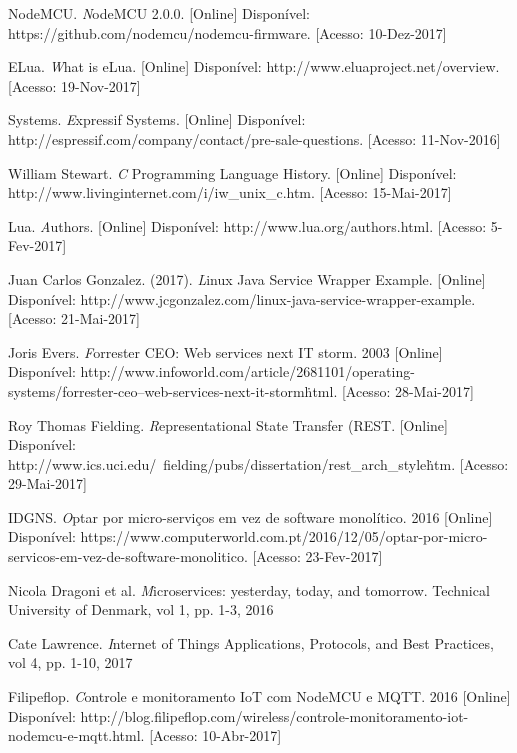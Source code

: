 \documentclass[journal]{IEEEtran}
\begin{document}
\begin{thebibliography}{1}
NodeMCU. \emph NodeMCU 2.0.0. [Online] Disponível: https://github.com/nodemcu/nodemcu-firmware. [Acesso: 10-Dez-2017]

ELua. \emph What is eLua. [Online] Disponível: http://www.eluaproject.net/overview. [Acesso: 19-Nov-2017]

Systems. \emph Expressif Systems. [Online] Disponível: http://espressif.com/company/contact/pre-sale-questions. [Acesso: 11-Nov-2016]

William Stewart. \emph C Programming Language History. [Online] Disponível: http://www.livinginternet.com/i/iw\_unix\_c.htm. [Acesso: 15-Mai-2017]

Lua. \emph Authors. [Online] Disponível: http://www.lua.org/authors.html. [Acesso: 5-Fev-2017]

Juan Carlos Gonzalez. (2017). \emph Linux Java Service Wrapper Example. [Online] Disponível: http://www.jcgonzalez.com/linux-java-service-wrapper-example. [Acesso: 21-Mai-2017]

Joris Evers. \emph Forrester CEO: Web services next IT storm. 2003 [Online] Disponível: http://www.infoworld.com/article/2681101/operating-systems/forrester-ceo--web-services-next-it-storm\.html. [Acesso: 28-Mai-2017]

Roy Thomas Fielding. \emph Representational State Transfer (REST. [Online] Disponível: http://www.ics.uci.edu/~fielding/pubs/dissertation/rest\_arch\_style\.htm. [Acesso: 29-Mai-2017]

IDGNS. \emph Optar por micro-serviços em vez de software monolítico. 2016 [Online] Disponível: https://www.computerworld.com.pt/2016/12/05/optar-por-micro-servicos-em-vez-de-software-monolitico. [Acesso: 23-Fev-2017]

Nicola Dragoni et al. \emph Microservices: yesterday, today, and tomorrow. Technical University of Denmark, vol 1, pp. 1-3, 2016

Cate Lawrence. \emph Internet of Things Applications, Protocols, and Best Practices, vol 4, pp. 1-10, 2017

Filipeflop. \emph Controle e monitoramento IoT com NodeMCU e MQTT. 2016 [Online] Disponível: http://blog.filipeflop.com/wireless/controle-monitoramento-iot-nodemcu-e-mqtt.html. [Acesso: 10-Abr-2017]

\end{thebibliography}
\end{document}
